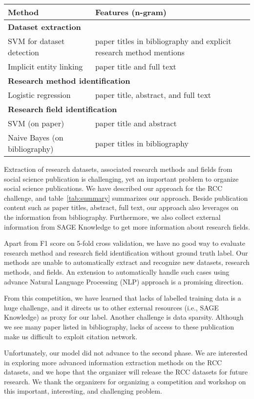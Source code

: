 \begin{table*}[t!]
\begin{center}
\begin{tabular}{|l|l|}
\hline \bf Method & \bf Features (n-gram) \\ \hline
\multicolumn{2}{|l|}{ \bf Dataset extraction} \\ \hline
SVM for dataset detection & paper titles in bibliography and explicit research method mentions \\ \hline
Implicit entity linking & paper title and full text \\ \hline
\multicolumn{2}{|l|}{ \bf Research method identification} \\ \hline
Logistic regression & paper title, abstract, and full text \\ \hline
\multicolumn{2}{|l|}{ \bf Research field identification} \\ \hline
SVM (on paper) & paper title and abstract \\ \hline
Naive Bayes (on bibliography) & paper titles in bibliography \\ \hline
\end{tabular}
\end{center}
\caption{\label{tab:summary} Summary of Our Approach}
\end{table*}

Extraction of research datasets, associated research methods and fields from social science publication is challenging, yet an important problem to organize social science publications. We have described our approach for the RCC challenge, and table~\ref{tab:summary} summarizes our approach. Beside publication content such as paper titles, abstract, full text, our approach also leverages on the information from bibliography. Furthermore, we also collect external information from SAGE Knowledge to get more information about research fields.

Apart from F1 score on 5-fold cross validation, we have no good way to evaluate research method and research field identification without ground truth label. Our methods are unable to automatically extract and recognize new datasets, research methods, and fields. An extension to automatically handle such cases using advance Natural Language Processing (NLP) approach is a promising direction.

From this competition, we have learned that lacks of labelled training data is a huge challenge, and it directs us to other external resources (i.e., SAGE Knowledge) as proxy for our label. Another challenge is data sparsity. Although we see many paper listed in bibliography, lacks of access to these publication make us difficult to exploit citation network.

Unfortunately, our model did not advance to the second phase. We are interested in exploring more advanced information extraction methods on the RCC datasets, and we hope that the organizer will release the RCC datasets for future research. We thank the organizers for organizing a competition and workshop on this important, interesting, and challenging problem.






